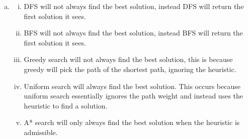 \documentclass[12pt]{article}%
\begin{document}
\begin{enumerate}[(a)]
  \newline
  \item
  \break
  \begin{enumerate}[i.]
    \item DFS will not always find the best solution, instead DFS will return the first solution it sees.
    \item BFS will not always find the best solution, instead BFS will return the first solution it sees.
    \item Greedy search will not always find the best solution, this is because greedy will pick the path of the shortest path, ignoring the heuristic.
    \item Uniform search will always find the best solution. This occurs because uniform search essentially ignores the path weight and instead uses the heuristic to find a solution.
    \item A* search will only always find the best solution when the heuristic is admissible.
  \end{enumerate}
\end{enumerate}
\end{document}
